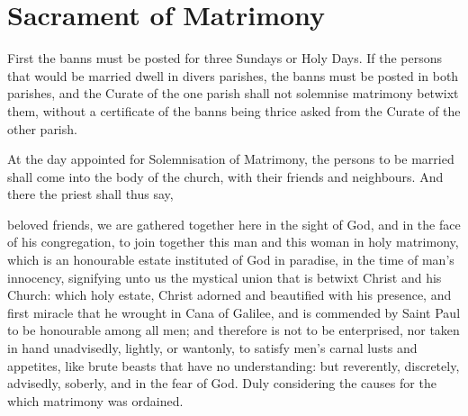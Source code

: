 \section{Sacrament of Matrimony}
\fancyhead[RE,LO]{}
\begin{secrubric}
First the banns must be posted for three Sundays or Holy Days. If the persons that would be married dwell in divers parishes, the banns must be posted in both parishes, and the Curate of the one parish shall not solemnise matrimony betwixt them, without a certificate of the banns being thrice asked from the Curate of the other parish.\par
At the day appointed for Solemnisation of Matrimony, the persons to be married shall come into the body of the church, with their friends and neighbours. And there the priest shall thus say,
\end{secrubric}
 beloved friends, we are gathered together here in the sight of God, and in the face of his congregation, to join together this man and this woman in holy matrimony, which is an honourable estate instituted of God in paradise, in the time of man's innocency, signifying unto us the mystical union that is betwixt Christ and his Church: which holy estate, Christ adorned and beautified with his presence, and first miracle that he wrought in Cana of Galilee, and is commended by Saint Paul to be honourable among all men; and therefore is not to be enterprised, nor taken in hand unadvisedly, lightly, or wantonly, to satisfy men's carnal lusts and appetites, like brute beasts that have no understanding: but reverently, discretely, advisedly, soberly, and in the fear of God. Duly considering the causes for the which matrimony was ordained.
\par
